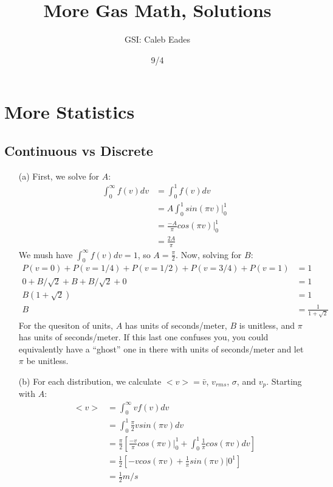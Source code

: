 \documentclass{article}
\begin{document}
	
\title{More Gas Math, Solutions}
\author{GSI: Caleb Eades}
\date{9/4}
\maketitle

\section{More Statistics}

\subsection{Continuous vs Discrete}

\begin{itemize}
	\item[(a)] First, we solve for $A$:
	\begin{align*}
	\int_0^{\infty} f(v)dv &= \int_0^1 f(v)dv \\
	&= A\int_0^1 sin(\pi v)|_0^1 \\
	&= \frac{-A}{\pi}cos(\pi v)|_0^1 \\
	&= \frac{2A}{\pi}
	\end{align*}
	We mush have $\int_0^{\infty} f(v)dv = 1$, so $A = \frac{\pi}{2}$. Now, solving for $B$:
	\begin{align*}
	P(v=0) + P(v=1/4) + P(v=1/2) + P(v=3/4) + P(v=1) &= 1 \\
	0 + B/\sqrt{2} + B + B/\sqrt{2} + 0 &= 1 \\
	B(1 + \sqrt{2}) &= 1 \\
	B &= \frac{1}{1+\sqrt{2}}
	\end{align*}
	For the quesiton of units, $A$ has units of seconds/meter, $B$ is unitless, and $\pi$ has units of seconds/meter. If this last one confuses you, you could equivalently have a ``ghost'' one in there with units of seconds/meter and let $\pi$ be unitless.
	\item[(b)] For each distribution, we calculate $<v> = \bar{v}$, $v_{rms}$, $\sigma$, and $v_p$. Starting with $A$:
	\begin{align*}
	<v> &= \int_0^{\infty} vf(v)dv \\
	&= \int_0^1 \frac{\pi}{2}vsin(\pi v)dv \\
	&= \frac{\pi}{2}\left[\frac{-v}{\pi}cos(\pi v)|_0^1 + \int_0^1\frac{1}{\pi}cos(\pi v)dv\right] \\
	&= \frac{1}{2}\left[-vcos(\pi v) + \frac{1}{\pi} sin(\pi v)|0^1\right] \\
	&= \frac{1}{2} m/s

\end{align*}
\end{itemize}
\end{document}
